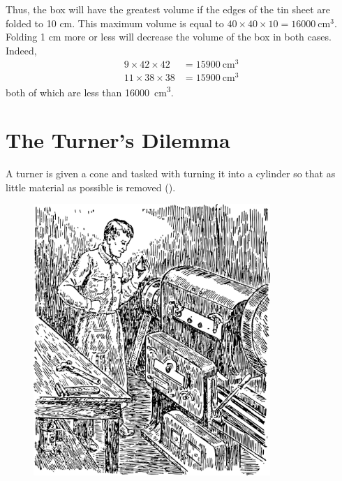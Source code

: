 Thus, the box will have the greatest volume if the edges of the tin sheet are folded to 10 cm. This maximum volume is equal to \(40 \times 40 \times 10 = \SI{16000}{\centi\meter\cubed}\). Folding 1 cm more or less will decrease the volume of the box in both cases. Indeed,
\begin{align*}%
9 \times 42 \times 42 & = \SI{15900}{\centi\meter\cubed}\\
11 \times 38 \times 38 & = \SI{15900}{\centi\meter\cubed}
\end{align*}
both of which are less than \SI{16000}{\centi\meter\cubed}.


\section{The Turner's Dilemma}
\label{sec-12.14}



\ques A turner is given a cone and tasked with turning it into a cylinder so that as little material as possible is removed ().


\begin{figure}[h!]
\centering
\includegraphics[width=0.8\textwidth]{figures/ch-12/fig-185.pdf}
\end{figure}

